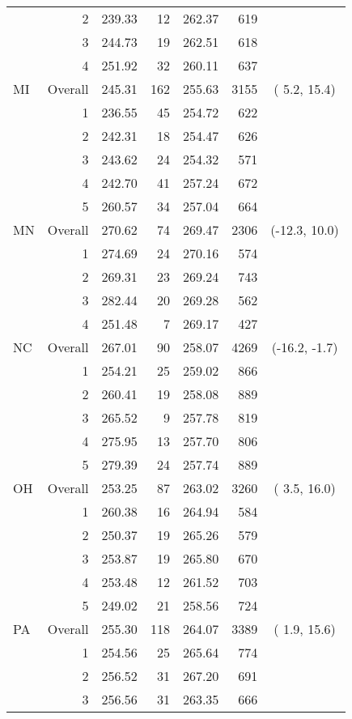 \begin{longtable}{lrrr@{\extracolsep{.25cm}}rrc}
   & 2 & 239.33 &  12 & 262.37 & 619 &  \\ 
   & 3 & 244.73 &  19 & 262.51 & 618 &  \\ 
   & 4 & 251.92 &  32 & 260.11 & 637 &  \\ 
   \hline
MI & Overall & 245.31 & 162 & 255.63 & 3155 & (  5.2,  15.4) \\ 
   & 1 & 236.55 &  45 & 254.72 & 622 &  \\ 
   & 2 & 242.31 &  18 & 254.47 & 626 &  \\ 
   & 3 & 243.62 &  24 & 254.32 & 571 &  \\ 
   & 4 & 242.70 &  41 & 257.24 & 672 &  \\ 
   & 5 & 260.57 &  34 & 257.04 & 664 &  \\ 
   \hline
MN & Overall & 270.62 &  74 & 269.47 & 2306 & (-12.3,  10.0) \\ 
   & 1 & 274.69 &  24 & 270.16 & 574 &  \\ 
   & 2 & 269.31 &  23 & 269.24 & 743 &  \\ 
   & 3 & 282.44 &  20 & 269.28 & 562 &  \\ 
   & 4 & 251.48 &   7 & 269.17 & 427 &  \\ 
   \hline
NC & Overall & 267.01 &  90 & 258.07 & 4269 & (-16.2,  -1.7) \\ 
   & 1 & 254.21 &  25 & 259.02 & 866 &  \\ 
   & 2 & 260.41 &  19 & 258.08 & 889 &  \\ 
   & 3 & 265.52 &   9 & 257.78 & 819 &  \\ 
   & 4 & 275.95 &  13 & 257.70 & 806 &  \\ 
   & 5 & 279.39 &  24 & 257.74 & 889 &  \\ 
   \hline
OH & Overall & 253.25 &  87 & 263.02 & 3260 & (  3.5,  16.0) \\ 
   & 1 & 260.38 &  16 & 264.94 & 584 &  \\ 
   & 2 & 250.37 &  19 & 265.26 & 579 &  \\ 
   & 3 & 253.87 &  19 & 265.80 & 670 &  \\ 
   & 4 & 253.48 &  12 & 261.52 & 703 &  \\ 
   & 5 & 249.02 &  21 & 258.56 & 724 &  \\ 
   \hline
PA & Overall & 255.30 & 118 & 264.07 & 3389 & (  1.9,  15.6) \\ 
   & 1 & 254.56 &  25 & 265.64 & 774 &  \\ 
   & 2 & 256.52 &  31 & 267.20 & 691 &  \\ 
   & 3 & 256.56 &  31 & 263.35 & 666 &  \\ 

\end{longtable}

